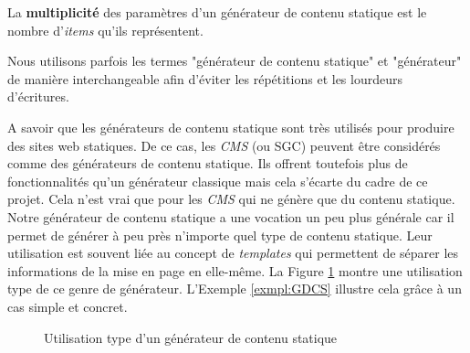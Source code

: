 		\begin{defn}
			 La \textbf{multiplicité} des paramètres d'un générateur de contenu statique est le nombre d'\textit{items} qu'ils représentent.
		\end{defn}
		
		\begin{note}
			Nous utilisons parfois les termes "générateur de contenu statique" et "générateur" de manière interchangeable afin d'éviter les répétitions et les lourdeurs d'écritures.
		\end{note}
		
		 A savoir que les générateurs de contenu statique sont très utilisés pour produire des sites web statiques. De ce cas, les \textit{CMS} (ou SGC) peuvent être considérés comme des générateurs de contenu statique. Ils offrent toutefois plus de fonctionnalités qu'un générateur classique mais cela s'écarte du cadre de ce projet. Cela n'est vrai que pour les \textit{CMS} qui ne génère que du contenu statique.\\
		 
		 Notre générateur de contenu statique a une vocation un peu plus générale car il permet de générer à peu près n'importe quel type de contenu statique. Leur utilisation est souvent liée au concept de \textit{templates} qui permettent de séparer les informations de la mise en page en elle-même. La Figure \ref{fig:use_of_generator} montre une utilisation type de ce genre de générateur. L'Exemple \ref{exmpl:GDCS} illustre cela grâce à un cas simple et concret.\\
		
		\begin{figure}[h]
			\begin{center}
			\caption{Utilisation type d'un générateur de contenu statique}
			\label{fig:use_of_generator}
			\end{center}
		\end{figure}
		
